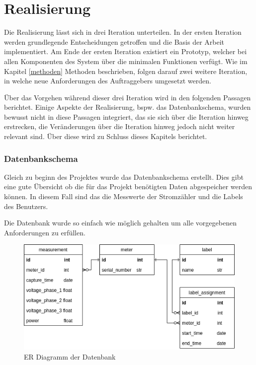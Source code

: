 \chapter{Realisierung}


Die Realisierung lässt sich in drei Iteration unterteilen.
In der ersten Iteration werden grundlegende Entscheidungen getroffen und die Basis der Arbeit implementiert.
Am Ende der ersten Iteration existiert ein Prototyp,
welcher bei allen Komponenten des System über die minimalen Funktionen verfügt.
Wie im Kapitel \ref{methoden} Methoden beschrieben, folgen darauf zwei weitere Iteration,
in welche neue Anforderungen des Auftraggebers umgesetzt werden.

Über das Vorgehen während dieser drei Iteration wird in den folgenden Passagen berichtet.
Einige Aspekte der Realisierung, bspw. das Datenbankschema,  wurden bewusst nicht in diese Passagen integriert,
das sie sich über die Iteration hinweg erstrecken, 
die Veränderungen über die Iteration hinweg jedoch nicht weiter relevant sind.
Über diese wird zu Schluss dieses Kapitels berichtet.





\subsection{Datenbankschema}

Gleich zu beginn des Projektes wurde das Datenbankschema erstellt.
Dies gibt eine gute Übersicht ob die für das Projekt benötigten Daten
abgespeicher werden können. In diesem Fall sind das die Messwerte der Stromzähler
und die Labels des Benutzers.

Die Datenbank wurde so einfach wie möglich gehalten um alle vorgegebenen
Anforderungen zu erfüllen.

\begin{figure}[h]
    \centering
    \includegraphics[width=1.0\textwidth]{gfx/smic-db}
    \caption{
        ER Diagramm der Datenbank
    }
    \label{fig:smic-db}
\end{figure}

